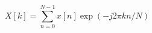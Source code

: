 \documentclass{jsarticle}
\begin{document}
\begin{equation*}
    X \left[k\right] = \sum_{n=0}^{N-1}x\left[n\right]\exp\left(-j 2\pi kn/N\right)
\end{equation*}
\end{document}
